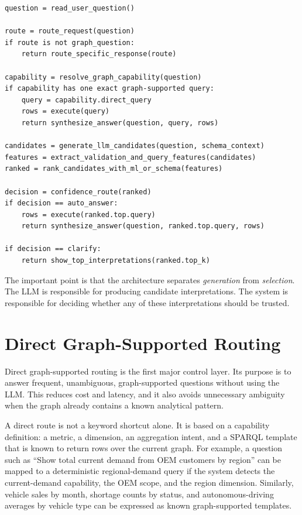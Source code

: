 \begin{lstlisting}[caption={Simplified runtime pipeline for one user question.}, label={lst:overall-runtime-pipeline}]
question = read_user_question()

route = route_request(question)
if route is not graph_question:
    return route_specific_response(route)

capability = resolve_graph_capability(question)
if capability has one exact graph-supported query:
    query = capability.direct_query
    rows = execute(query)
    return synthesize_answer(question, query, rows)

candidates = generate_llm_candidates(question, schema_context)
features = extract_validation_and_query_features(candidates)
ranked = rank_candidates_with_ml_or_schema(features)

decision = confidence_route(ranked)
if decision == auto_answer:
    rows = execute(ranked.top.query)
    return synthesize_answer(question, ranked.top.query, rows)

if decision == clarify:
    return show_top_interpretations(ranked.top_k)
\end{lstlisting}

The important point is that the architecture separates \emph{generation} from \emph{selection}. The LLM is responsible for producing candidate interpretations. The system is responsible for deciding whether any of these interpretations should be trusted.

\section{Direct Graph-Supported Routing}
\label{sec:direct-graph-supported-routing}

Direct graph-supported routing is the first major control layer. Its purpose is to answer frequent, unambiguous, graph-supported questions without using the LLM. This reduces cost and latency, and it also avoids unnecessary ambiguity when the graph already contains a known analytical pattern.

A direct route is not a keyword shortcut alone. It is based on a capability definition: a metric, a dimension, an aggregation intent, and a SPARQL template that is known to return rows over the current graph. For example, a question such as ``Show total current demand from OEM customers by region'' can be mapped to a deterministic regional-demand query if the system detects the current-demand capability, the OEM scope, and the region dimension. Similarly, vehicle sales by month, shortage counts by status, and autonomous-driving averages by vehicle type can be expressed as known graph-supported templates.

